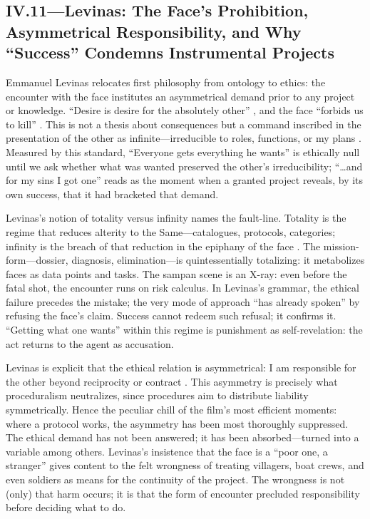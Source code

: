 \subsection*{IV.11—Levinas: The Face's Prohibition, Asymmetrical Responsibility, and Why
	``Success'' Condemns Instrumental Projects}
\label{ssec:iii-levinas}
Emmanuel Levinas relocates first philosophy from ontology to ethics: the encounter with the face
institutes an asymmetrical demand prior to any project or knowledge. ``Desire is desire for the
absolutely other'' \parencite[p.~33]{LevinasTI1969}, and the face ``forbids us to kill''
\parencite[p.~199]{LevinasTI1969}. This is not a thesis about consequences but a command
inscribed in the presentation of the other as infinite—irreducible to roles, functions, or my
plans \parencite[pp.~194--201]{LevinasTI1969}. Measured by this standard, ``Everyone gets
everything he wants'' is ethically null until we ask whether what was wanted preserved the
other's irreducibility; ``\ldots and for my sins I got one'' reads as the moment when a granted
project reveals, by its own success, that it had bracketed that demand.

Levinas's notion of totality versus infinity names the fault-line. Totality is the regime that
reduces alterity to the Same—catalogues, protocols, categories; infinity is the breach of that
reduction in the epiphany of the face \parencite[pp.~21--24, 33--36]{LevinasTI1969}. The
mission-form—dossier, diagnosis, elimination—is quintessentially totalizing: it metabolizes
faces as data points and tasks. The sampan scene is an X-ray: even before the fatal shot, the
encounter runs on risk calculus. In Levinas's grammar, the ethical failure precedes the mistake;
the very mode of approach ``has already spoken'' by refusing the face's claim. Success cannot
redeem such refusal; it confirms it. ``Getting what one wants'' within this regime is punishment
as self-revelation: the act returns to the agent as accusation.

Levinas is explicit that the ethical relation is asymmetrical: I am responsible for the other
beyond reciprocity or contract \parencite[pp.~215--219]{LevinasTI1969}. This asymmetry is
precisely what proceduralism neutralizes, since procedures aim to distribute liability
symmetrically. Hence the peculiar chill of the film's most efficient moments: where a protocol
works, the asymmetry has been most thoroughly suppressed. The ethical demand has not been
answered; it has been absorbed—turned into a variable among others. Levinas's insistence that
the face is a ``poor one, a stranger'' \parencite[p.~213]{LevinasTI1969} gives content to the
felt wrongness of treating villagers, boat crews, and even soldiers as means for the continuity
of the project. The wrongness is not (only) that harm occurs; it is that the form of encounter
precluded responsibility before deciding what to do.

